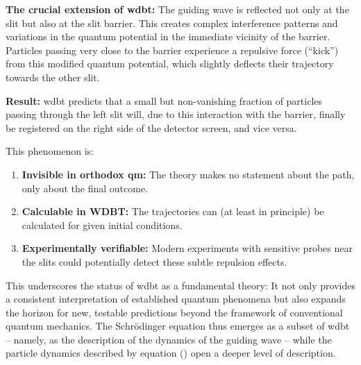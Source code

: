 \textbf{The crucial extension of \gls{wdbt}:} The guiding wave is reflected not only at the slit but also at the slit barrier. This creates complex interference patterns and variations in the quantum potential in the immediate vicinity of the barrier. Particles passing very close to the barrier experience a repulsive force (\enquote{kick}) from this modified quantum potential, which slightly deflects their trajectory towards the other slit.

\textbf{Result:} \gls{wdbt} predicts that a small but non-vanishing fraction of particles passing through the left slit will, due to this interaction with the barrier, finally be registered on the right side of the detector screen, and vice versa.

This phenomenon is:

\begin{enumerate}
    \item \textbf{Invisible in orthodox \gls{qm}:} The theory makes no statement about the path, only about the final outcome.
    \item \textbf{Calculable in WDBT:} The trajectories can (at least in principle) be calculated for given initial conditions.
    \item \textbf{Experimentally verifiable:} Modern experiments with sensitive probes near the slits could potentially detect these subtle repulsion effects.
\end{enumerate}

This underscores the status of \gls{wdbt} as a fundamental theory: It not only provides a consistent interpretation of established quantum phenomena but also expands the horizon for new, testable predictions beyond the framework of conventional quantum mechanics. The Schrödinger equation thus emerges as a subset of \gls{wdbt} – namely, as the description of the dynamics of the guiding wave – while the particle dynamics described by equation () open a deeper level of description.